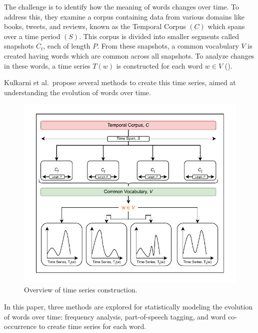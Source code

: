 The challenge is to identify how the meaning of words changes over time.
To address this, they examine a corpus containing data from various domains like books, tweets, and reviews, known as the Temporal Corpus $(C)$ which spans over a time period $(S)$.
This corpus is divided into smaller segments called snapshots $C_t$, each of length $P$.
From these snapshots, a common vocabulary $V$ is created having words which are common across all snapshots.
To analyze changes in these words, a time series $T(w)$ is constructed for each word $w\in V$ ().

Kulkarni et al.\ propose several methods to create this time series, aimed at understanding the evolution of words over time.

\begin{figure}[!h]
    \centering
    \vspace{-1em}
    \includegraphics[scale=0.8]{figures/kulkarni_drawio}
    \vspace*{-0.7cm}
    \caption{Overview of time series construction.}
    \label{fig:kulkarni-overview}
\end{figure}

In this paper, three methods are explored for statistically modeling the evolution of words over time:
frequency analysis, part-of-speech tagging, and word co-occurrence to create time series for each word.

